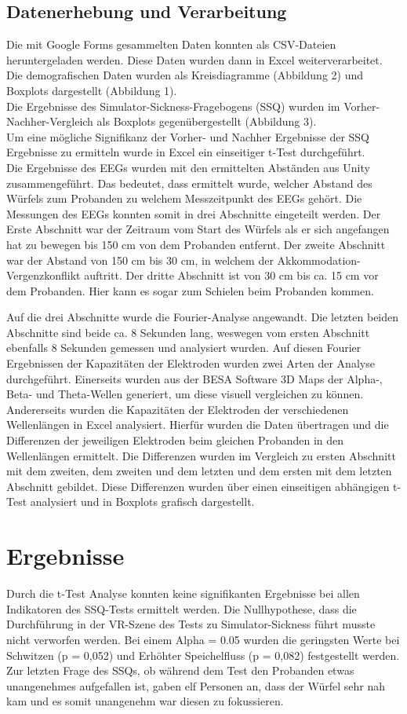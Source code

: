 \documentclass[conference]{IEEEtran}
\begin{document}
\subsection{Datenerhebung und Verarbeitung}
Die mit Google Forms gesammelten Daten konnten als CSV-Dateien heruntergeladen werden. Diese Daten wurden dann in Excel weiterverarbeitet. Die demografischen Daten wurden als Kreisdiagramme (Abbildung 2) und Boxplots dargestellt (Abbildung 1).\\
Die Ergebnisse des Simulator-Sickness-Fragebogens (SSQ) wurden im Vorher-Nachher-Vergleich als Boxplots gegenübergestellt (Abbildung 3).\\
Um eine mögliche Signifikanz der Vorher- und Nachher Ergebnisse der SSQ Ergebnisse zu ermitteln wurde in Excel ein einseitiger t-Test durchgeführt.\\ 
Die Ergebnisse des EEGs wurden mit den ermittelten Abständen aus Unity zusammengeführt. Das bedeutet, dass ermittelt wurde, welcher Abstand des Würfels zum Probanden zu welchem Messzeitpunkt des EEGs gehört. Die Messungen des EEGs konnten somit in drei Abschnitte eingeteilt werden. Der Erste Abschnitt war der Zeitraum vom Start des Würfels als er sich angefangen hat zu bewegen bis 150 cm von dem Probanden entfernt. Der zweite Abschnitt war der Abstand von 150 cm bis 30 cm, in welchem der Akkommodation-Vergenzkonflikt auftritt. Der dritte Abschnitt ist von 30 cm bis ca. 15 cm vor dem Probanden. Hier kann es sogar zum Schielen beim Probanden kommen.

Auf die drei Abschnitte wurde die Fourier-Analyse angewandt. Die letzten beiden Abschnitte sind beide ca. 8 Sekunden lang, weswegen vom ersten Abschnitt ebenfalls 8 Sekunden gemessen und analysiert wurden.
Auf diesen Fourier Ergebnissen der Kapazitäten der Elektroden wurden zwei Arten der Analyse durchgeführt. Einerseits wurden aus der BESA Software 3D Maps der Alpha-, Beta- und Theta-Wellen generiert, um diese visuell vergleichen zu können. Andererseits wurden die Kapazitäten der Elektroden der verschiedenen Wellenlängen in Excel analysiert. Hierfür wurden die Daten übertragen und die Differenzen der jeweiligen Elektroden beim gleichen Probanden in den Wellenlängen ermittelt. Die Differenzen wurden im Vergleich zu ersten Abschnitt mit dem zweiten, dem zweiten und dem letzten und dem ersten mit dem letzten Abschnitt gebildet. Diese Differenzen wurden über einen einseitigen abhängigen t-Test analysiert und in Boxplots grafisch dargestellt.


\section{Ergebnisse}
Durch die t-Test Analyse konnten keine signifikanten Ergebnisse bei allen Indikatoren des SSQ-Tests ermittelt werden. Die Nullhypothese, dass die Durchführung in der VR-Szene des Tests zu Simulator-Sickness führt musste nicht verworfen werden. Bei einem Alpha = 0.05 wurden die geringsten Werte bei Schwitzen (p = 0,052) und Erhöhter Speichelfluss (p = 0,082) festgestellt werden. Zur letzten Frage des SSQs, ob während dem Test den Probanden etwas unangenehmes aufgefallen ist, gaben elf Personen an, dass der Würfel sehr nah kam und es somit unangenehm war diesen zu fokussieren.\\
\end{document}
